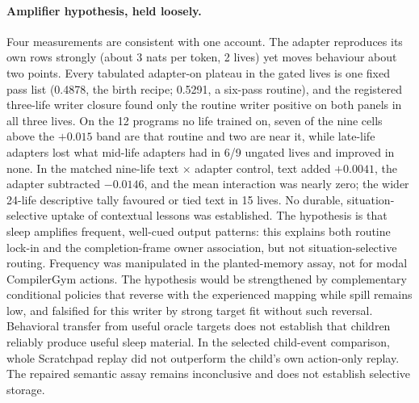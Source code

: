 \documentclass{article}
\begin{document}
\paragraph{Amplifier hypothesis, held loosely.} Four measurements are consistent with one account. The adapter reproduces its own rows strongly (about 3 nats per token, 2 lives) yet moves behaviour about two points. Every tabulated adapter-on plateau in the gated lives is one fixed pass list (0.4878, the birth recipe; 0.5291, a six-pass routine), and the registered three-life writer closure found only the routine writer positive on both panels in all three lives. On the 12 programs no life trained on, seven of the nine cells above the $+0.015$ band are that routine and two are near it, while late-life adapters lost what mid-life adapters had in 6/9 ungated lives and improved in none. In the matched nine-life text $\times$ adapter control, text added $+0.0041$, the adapter subtracted $-0.0146$, and the mean interaction was nearly zero; the wider 24-life descriptive tally favoured or tied text in 15 lives. No durable, situation-selective uptake of contextual lessons was established. The hypothesis is that sleep amplifies frequent, well-cued output patterns: this explains both routine lock-in and the completion-frame owner association, but not situation-selective routing. Frequency was manipulated in the planted-memory assay, not for modal CompilerGym actions. The hypothesis would be strengthened by complementary conditional policies that reverse with the experienced mapping while spill remains low, and falsified for this writer by strong target fit without such reversal. Behavioral transfer from useful oracle targets does not establish that children reliably produce useful sleep material. In the selected child-event comparison, whole Scratchpad replay did not outperform the child's own action-only replay. The repaired semantic assay remains inconclusive and does not establish selective storage.
\end{document}
